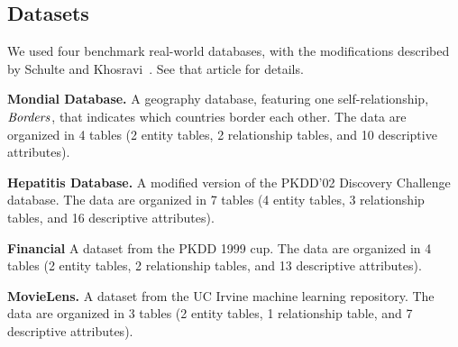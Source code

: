 \documentclass[oribibl]{llncs}
\begin{document}
\subsection{Datasets} 

We used %
four benchmark real-world databases, with the modifications described by Schulte and Khosravi~\cite{Schulte2012}. See that article for details.  %



\noindent\textbf{Mondial Database.} A geography database, featuring
one self-relationship, $\it{Borders}$, that indicates which countries border each other. The data are organized in 4 tables (2 entity tables, 2 relationship tables, and 10 descriptive attributes).

\noindent\textbf{Hepatitis Database.} A modified version of the PKDD'02 Discovery Challenge database. The data are organized in 7 tables (4 entity tables, 3 relationship tables, and 16 descriptive attributes).

\noindent\textbf{Financial} A dataset from the PKDD 1999 cup. The data are organized in 4 tables (2 entity tables, 2 relationship tables, and 13 descriptive attributes).

\noindent\textbf{MovieLens.} A dataset from the UC Irvine machine learning repository. The data are organized in 3 tables (2 entity tables, 1 relationship table, and 7 descriptive attributes). 
\end{document}
